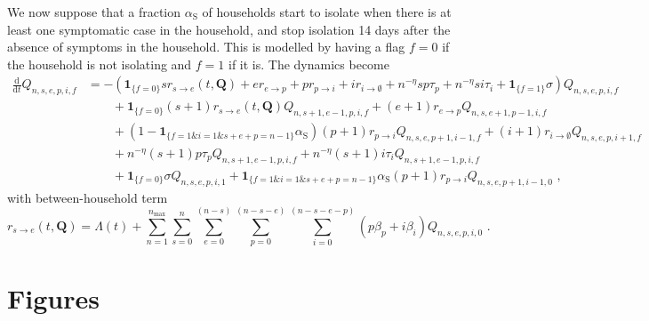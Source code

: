 \documentclass[10pt,a4paper]{article}
\newcommand{\be}{\begin{equation}}
\newcommand{\ee}{\end{equation}}
\newcommand{\ba}{\begin{equation} \begin{aligned}}
\newcommand{\ea}{\end{aligned} \end{equation}}
\newcommand{\ddt}[1]{\frac{\mathrm{d}#1}{\mathrm{d}t}}
\newcommand{\indic}[1]{\mathbf{1}_{\{#1\}}}
\begin{document}
We now suppose that a fraction $\alpha_{\mathrm{S}}$ of households start to
isolate when there is at least one symptomatic case in the household, and stop
isolation 14 days after the absence of symptoms in the household. This is
modelled by having a flag $f=0$ if the household is not isolating and $f=1$ if
it is. The dynamics become
\ba
\ddt{}Q_{n,s,e,p,i,f} & = - \left(\indic{f=0}s r_{s\rightarrow e}(t,\mathbf{Q}) + e
r_{e\rightarrow p} + p r_{p\rightarrow i} + i r_{i\rightarrow \emptyset} 
+ n^{-\eta}s p \tau_p  + n^{-\eta}s i  \tau_i 
+ \indic{f=1} \sigma \right) Q_{n,s,e,p,i,f}
\\ & \qquad
+ \indic{f=0}(s+1) r_{s\rightarrow e}(t,\mathbf{Q}) Q_{n,s+1,e-1,p,i,f}
+ (e+1) r_{e\rightarrow p} Q_{n,s,e+1,p-1,i,f}
\\ & \qquad
+ (1-\indic{f=1 \& i=1 \& s+e+p=n-1} \alpha_{\mathrm{S}})
(p+1) r_{p\rightarrow i} Q_{n,s,e,p+1,i-1,f}
+ (i+1) r_{i\rightarrow \emptyset} Q_{n,s,e,p,i+1,f}
\\ & \qquad
+ n^{-\eta}(s+1) p \tau_p Q_{n,s+1,e-1,p,i,f}
+ n^{-\eta}(s+1) i \tau_i Q_{n,s+1,e-1,p,i,f}
\\ & \qquad
+ \indic{f=0} \sigma Q_{n,s,e,p,i,1}
+ \indic{f=1 \& i=1 \& s+e+p=n-1} \alpha_{\mathrm{S}}
(p+1)r_{p\rightarrow i} Q_{n,s,e,p+1,i-1,0}
\text{ ,}
\ea
with between-household term
\be
r_{s\rightarrow e}(t,\mathbf{Q}) = \Lambda(t) +
\sum_{n=1}^{n_{\mathrm{max}}}
\sum_{s=0}^{n}
\sum_{e=0}^{(n-s)}
\sum_{p=0}^{(n-s-e)}
\sum_{i=0}^{(n-s-e-p)}
\left(p \beta_p + i \beta_i \right) Q_{n,s,e,p,i,0}
\text{ .}
\ee





\clearpage

\section*{Figures}
\end{document}

